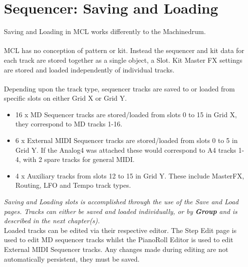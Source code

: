 \chapter{Sequencer: Saving and Loading}
Saving and Loading in MCL works differently to the Machinedrum.\\\\
MCL has no conception of pattern or kit. Instead the sequencer and kit data for each track are stored together as a single object, a Slot. Kit Master FX settings are stored and loaded independently of individual tracks.
\\\\
Depending upon the track type, sequencer tracks are saved to or loaded from specific slots on either Grid X or Grid Y.

\begin{itemize}
    \item 16 x MD Sequencer tracks are stored/loaded from slots 0 to 15 in Grid X, they correspond to MD tracks 1-16.
    \item 6 x External MIDI Sequencer tracks are stored/loaded from slots 0 to 5 in Grid Y. If the Analog4 was attached these would correspond to A4 tracks 1- 4, with 2 spare tracks for general MIDI.
    \item 4 x Auxiliary tracks from slots 12 to 15 in Grid Y. These include MasterFX, Routing, LFO and Tempo track types.
\end{itemize}

\textit{Saving and Loading slots is accomplished through the use of the Save and Load pages.  Tracks can either be saved and loaded individually, or by \textbf{Group} and is described in the next chapter(s).}\\

Loaded tracks can be edited via their respective editor. The Step Edit page is used to edit MD sequencer tracks whilst the PianoRoll Editor is used to edit External MIDI Sequencer tracks. Any changes made during editing are not automatically persistent, they must be saved.\\

